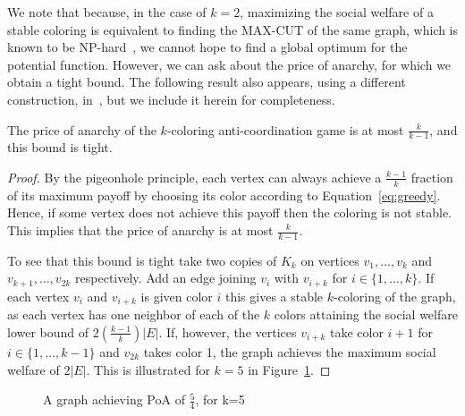 We note that because, in the case of $k=2$, maximizing the social welfare of a
stable coloring is equivalent to finding the MAX-CUT of the same graph, which
is known to be NP-hard~\cite{GareyJ79}, we cannot hope to find a global optimum
for the potential function.  However, we can ask about the price of anarchy,
for which we obtain a tight bound.  The following result also appears, using a
different construction, in~\cite{Hoefer2007}, but we include it herein for
completeness.

\begin{proposition}\label{obs:poa}
The price of anarchy of the $k$-coloring anti-coordination game is at most
$\frac{k}{k-1}$, and this bound is tight.
\end{proposition}

\begin{proof}
By the pigeonhole principle, each vertex can always achieve a $\frac{k-1}{k}$
fraction of its maximum payoff by choosing its color according to
Equation~\ref{eq:greedy}.  Hence, if some vertex does not achieve this payoff
then the coloring is not stable.  This implies that the price of anarchy is at
most $\frac{k}{k-1}$.

To see that this bound is tight take two copies of $K_k$ on vertices $v_1,
\dots, v_k$ and $v_{k+1}, \dots, v_{2k}$ respectively. Add an edge joining
$v_i$ with $v_{i+k}$ for $i\in \{1,\dots,k\}$. If each vertex $v_i$ and
$v_{i+k}$ is given color $i$ this gives a stable $k$-coloring of the graph, as
each vertex has one neighbor of each of the $k$ colors attaining the social
welfare lower bound of $2(\frac{k-1}{k})|E|$. If, however, the vertices
$v_{i+k}$ take color $i+1$ for $i\in\{1,\dots,k-1\}$ and $v_{2k}$ takes color
1, the graph achieves the maximum social welfare of $2|E|$.  This is
illustrated for $k=5$ in Figure~\ref{fig:k5copies}.
\hfill
\end{proof}

\begin{figure}[htb]
\centering
{}
\caption{A graph achieving PoA of $\frac{5}{4}$, for k=5}
\label{fig:k5copies}
\end{figure}

